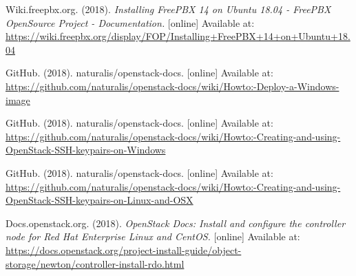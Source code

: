\documentclass{article}
\begin{document}
\begin{thebibliography}{9}
  Wiki.freepbx.org. (2018). \emph{Installing FreePBX 14 on Ubuntu 18.04 - FreePBX OpenSource Project - Documentation.}
  [online] Available at: \url{https://wiki.freepbx.org/display/FOP/Installing+FreePBX+14+on+Ubuntu+18.04}

  GitHub. (2018). naturalis/openstack-docs.
  [online] Available at: \url{https://github.com/naturalis/openstack-docs/wiki/Howto:-Deploy-a-Windows-image}

  GitHub. (2018). naturalis/openstack-docs.
  [online] Available at: \url{https://github.com/naturalis/openstack-docs/wiki/Howto:-Creating-and-using-OpenStack-SSH-keypairs-on-Windows}

  GitHub. (2018). naturalis/openstack-docs.
  [online] Available at: \url{https://github.com/naturalis/openstack-docs/wiki/Howto:-Creating-and-using-OpenStack-SSH-keypairs-on-Linux-and-OSX}

  Docs.openstack.org. (2018). \emph{OpenStack Docs: Install and configure the controller node for Red Hat Enterprise Linux and CentOS.}
  [online] Available at: \url{https://docs.openstack.org/project-install-guide/object-storage/newton/controller-install-rdo.html}

\end{thebibliography}
\end{document}
